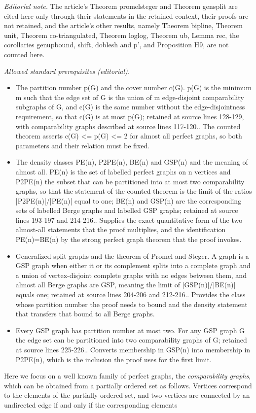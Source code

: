 \documentclass[12pt]{article}
\begin{document}
\noindent\textit{Editorial note.} The article's Theorem promelsteger and Theorem gensplit are cited here only through their statements in the retained context, their proofs are not retained, and the article's other results, namely Theorem bipline, Theorem unit, Theorem co-triangulated, Theorem loglog, Theorem ub, Lemma rec, the corollaries genupbound, shift, doblesh and p', and Proposition H9, are not counted here.\par\medskip
\noindent\textit{Allowed standard prerequisites (editorial).}\begin{itemize}
\item The partition number p(G) and the cover number c(G). p(G) is the minimum m such that the edge set of G is the union of m edge-disjoint comparability subgraphs of G, and c(G) is the same number without the edge-disjointness requirement, so that c(G) is at most p(G); retained at source lines 128-129, with comparability graphs described at source lines 117-120.. The counted theorem asserts c(G) <= p(G) <= 2 for almost all perfect graphs, so both parameters and their relation must be fixed.
\item The density classes PE(n), P2PE(n), BE(n) and GSP(n) and the meaning of almost all. PE(n) is the set of labelled perfect graphs on n vertices and P2PE(n) the subset that can be partitioned into at most two comparability graphs, so that the statement of the counted theorem is the limit of the ratios |P2PE(n)|/|PE(n)| equal to one; BE(n) and GSP(n) are the corresponding sets of labelled Berge graphs and labelled GSP graphs; retained at source lines 193-197 and 214-216.. Supplies the exact quantitative form of the two almost-all statements that the proof multiplies, and the identification PE(n)=BE(n) by the strong perfect graph theorem that the proof invokes.
\item Generalized split graphs and the theorem of Promel and Steger. A graph is a GSP graph when either it or its complement splits into a complete graph and a union of vertex-disjoint complete graphs with no edges between them, and almost all Berge graphs are GSP, meaning the limit of |GSP(n)|/|BE(n)| equals one; retained at source lines 204-206 and 212-216.. Provides the class whose partition number the proof needs to bound and the density statement that transfers that bound to all Berge graphs.
\item Every GSP graph has partition number at most two. For any GSP graph G the edge set can be partitioned into two comparability graphs of G; retained at source lines 225-226.. Converts membership in GSP(n) into membership in P2PE(n), which is the inclusion the proof uses for the first limit.
\end{itemize}\medskip
Here we focus on a well known family of perfect graphs, the {\em comparability graphs},
which can be obtained from a partially ordered set as follows.
Vertices correspond to the elements of the partially ordered set,
and two vertices are connected by an undirected edge if and only if the corresponding elements
\end{document}
